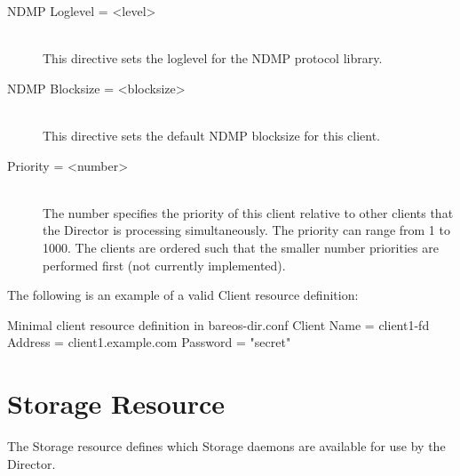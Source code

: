 \begin{description}
\item [NDMP Loglevel = {\textless}level{\textgreater}] \hfill \\
This directive sets the loglevel for the NDMP protocol library.

\item [NDMP Blocksize = {\textless}blocksize{\textgreater}] \hfill \\
This directive sets the default NDMP blocksize for this client.


\item [Priority = {\textless}number{\textgreater}] \hfill \\
The number specifies the  priority of this client relative to other clients
that the  Director is processing simultaneously. The priority can range  from
1 to 1000. The clients are ordered such that the smaller  number priorities
are performed first (not currently  implemented).

\end{description}

The following is an example of a valid Client resource definition:

\begin{bconfig}{Minimal client resource definition in bareos-dir.conf}
Client {
  Name = client1-fd
  Address = client1.example.com
  Password = "secret"
}
\end{bconfig}

\section{Storage Resource}
\label{StorageResource2}

The Storage resource defines which Storage daemons are available for use by
the Director.

